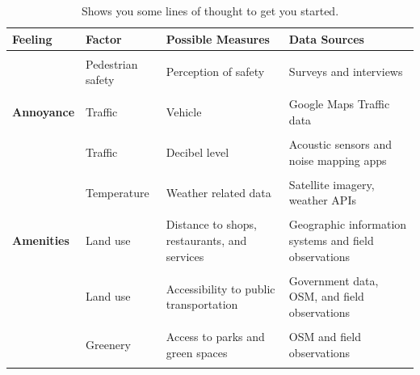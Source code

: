 \documentclass[
]{latex/krantz}
\begin{document}
\begin{table}

\caption{\label{tab:sample-feelings-measures}Shows you some lines of thought to get you started.}
\centering
\begin{tabular}[t]{>{\raggedright\arraybackslash}p{5em}l>{\raggedright\arraybackslash}p{7em}>{\raggedright\arraybackslash}p{12em}}
\toprule
Feeling & Factor & Possible Measures & Data Sources\\
\midrule
\textbf{\cellcolor{gray!6}{Fear}} & \cellcolor{gray!6}{Pedestrian safety} & \cellcolor{gray!6}{Number of reported crimes} & \cellcolor{gray!6}{Government records}\\
\textbf{} & Pedestrian safety & Perception of safety & Surveys and interviews\\
\textbf{\cellcolor{gray!6}{}} & \cellcolor{gray!6}{Pedestrian safety} & \cellcolor{gray!6}{Lighting levels} & \cellcolor{gray!6}{Field observations and light meters}\\
\textbf{Annoyance} & Traffic & Vehicle & Google Maps Traffic data\\
\textbf{\cellcolor{gray!6}{}} & \cellcolor{gray!6}{Traffic} & \cellcolor{gray!6}{Average travel time} & \cellcolor{gray!6}{GPS data and traffic apps}\\
\addlinespace
\textbf{} & Traffic & Decibel level & Acoustic sensors and noise mapping apps\\
\textbf{\cellcolor{gray!6}{Discomfort}} & \cellcolor{gray!6}{Air quality} & \cellcolor{gray!6}{Particulate matter concentration} & \cellcolor{gray!6}{Air quality monitoring data}\\
\textbf{} & Temperature & Weather related data & Satellite imagery, weather APIs\\
\textbf{\cellcolor{gray!6}{}} & \cellcolor{gray!6}{Water-logging} & \cellcolor{gray!6}{Flood risk assessments} & \cellcolor{gray!6}{Elevation data, government data}\\
\textbf{Amenities} & Land use & Distance to shops, restaurants, and services & Geographic information systems and field observations\\
\addlinespace
\textbf{\cellcolor{gray!6}{}} & \cellcolor{gray!6}{Land use} & \cellcolor{gray!6}{Diversity of land uses} & \cellcolor{gray!6}{Government records, OSM data, Google Maps data, field observations}\\
\textbf{} & Land use & Accessibility to public transportation & Government data, OSM, and field observations\\
\textbf{\cellcolor{gray!6}{Pleasantness \& Vibrancy}} & \cellcolor{gray!6}{Greenery} & \cellcolor{gray!6}{Tree canopy coverage} & \cellcolor{gray!6}{Aerial imagery and remote sensing data}\\
\textbf{} & Greenery & Access to parks and green spaces & OSM and field observations\\
\textbf{\cellcolor{gray!6}{}} & \cellcolor{gray!6}{Greenery} & \cellcolor{gray!6}{} & \cellcolor{gray!6}{}\\
\bottomrule
\end{tabular}
\end{table}
\end{document}
